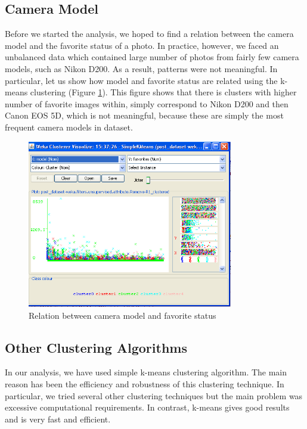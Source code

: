 \documentclass[letter,12pt]{article}
\begin{document}
\subsection{Camera Model}

Before we started the analysis, we hoped to find a relation between
the camera model and the favorite status of a photo. In practice,
however, we faced an unbalanced data which contained large number
of photos from fairly few camera models, such as Nikon D200. As a
result, patterns were not meaningful. In particular, let us show how
model and favorite status are related using the k-means clustering
(Figure \ref{Flo:model_fav}). This figure shows that there is clusters
with higher number of favorite images within, simply correspond to
Nikon D200 and then Canon EOS 5D, which is not meaningful, because
these are simply the most frequent camera models in dataset.


\begin{figure}
\centering
\includegraphics[width=0.8\textwidth]{fav_model.png}
\caption{Relation between camera model and favorite status}
\label{Flo:model_fav}
\end{figure}

\subsection{Other Clustering Algorithms}

In our analysis, we have used simple k-means clustering algorithm.
The main reason has been the efficiency and robustness of this clustering
technique. In particular, we tried several other clustering techniques
but the main problem was excessive computational requirements. In
contrast, k-means gives good results and is very fast and efficient.
\end{document}
